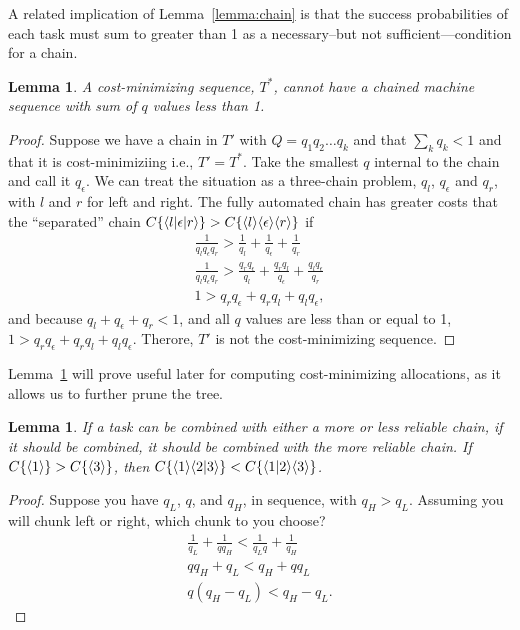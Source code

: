 \documentclass{article}
\newtheorem{lemma}[theorem]{Lemma}
\begin{document}
A related implication of Lemma~\ref{lemma:chain} is that the success probabilities of each task must sum to greater than 1 as a necessary--but not sufficient---condition for a chain.

\begin{lemma} \label{lemma:sum1}
A cost-minimizing sequence, $T^*$, cannot have a chained machine sequence with sum of $q$ values less than 1.
\end{lemma}
\begin{proof}
Suppose we have a chain in $T'$ with $Q = q_1 q_2\ldots q_k$ and that $\sum_k q_k < 1$ and that it is cost-minimiziing i.e., $T' = T^*$.
Take the smallest $q$ internal to the chain and call it $q_\epsilon$.
We can treat the situation as a three-chain problem, $q_l$, $q_\epsilon$ and $q_r$, with $l$ and $r$ for left and right.
The fully automated chain has greater costs that the ``separated'' chain $C\{ \langle l|\epsilon|r \rangle \} > C\{ \langle l \rangle\langle \epsilon \rangle\langle r \rangle \}$ if
\begin{align}
  \frac{1}{q_lq_{\epsilon}q_r} > \frac{1}{q_l} + \frac{1}{q_\epsilon} + \frac{1}{q_r}  \nonumber \\
   \frac{1}{q_lq_{\epsilon}q_r} > \frac{q_r q_\epsilon}{q_l} + \frac{q_rq_l}{q_\epsilon} + \frac{q_lq_\epsilon}{q_r} \nonumber \\
   1 > q_r q_\epsilon + q_rq_l + q_lq_\epsilon \nonumber,
\end{align}
and because $q_l + q_\epsilon + q_r < 1$, and all $q$ values are less than or equal to 1, $1 > q_r q_\epsilon + q_rq_l + q_lq_\epsilon$.
Therore, $T'$ is not the cost-minimizing sequence.
\end{proof}

Lemma~\ref{lemma:sum1} will prove useful later for computing cost-minimizing allocations, as it allows us to further prune the tree.  

\begin{lemma} \label{lemma:pair_better}
If a task can be combined with either a more or less reliable chain, if it should be combined, it should be combined with the more reliable chain.
 If $C\{ \langle 1 \rangle \} > C\{ \langle 3 \rangle \}$, then $C\{ \langle 1 \rangle\langle 2|3 \rangle \} < C\{ \langle 1|2 \rangle\langle 3 \rangle \}$.
 \end{lemma}
\begin{proof}
Suppose you have $q_L$, $q$, and $q_H$, in sequence, with $q_H > q_L$.
Assuming you will chunk left or right, which chunk to you choose?
\begin{align}
 \frac{1}{q_L} + \frac{1}{q q_H} < \frac{1}{q_L q} + \frac{1}{q_H} \\
  q q_H + q_L < q_H + q q_L \\
  q (q_H  - q_L) < q_H - q_L.
\end{align}
\end{proof}
\end{document}
